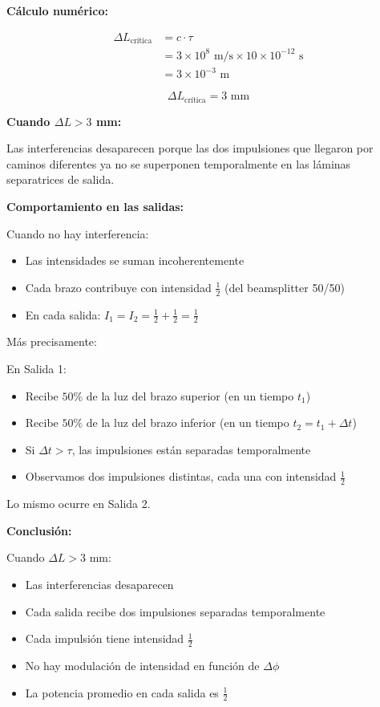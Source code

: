 \documentclass[12pt,a4paper]{article}
\begin{document}
\textbf{Cálculo numérico:}

\begin{align}
    \Delta L_{\text{crítica}} &= c \cdot \tau \\
    &= 3 \times 10^8 \text{ m/s} \times 10 \times 10^{-12} \text{ s} \\
    &= 3 \times 10^{-3} \text{ m}
\end{align}

\begin{equation}
    \boxed{\Delta L_{\text{crítica}} = 3 \text{ mm}}
\end{equation}

\textbf{Cuando $\Delta L > 3$ mm:}

Las interferencias desaparecen porque las dos impulsiones que llegaron por caminos diferentes ya no se superponen temporalmente en las láminas separatrices de salida.

\textbf{Comportamiento en las salidas:}

Cuando no hay interferencia:
\begin{itemize}
    \item Las intensidades se suman incoherentemente
    \item Cada brazo contribuye con intensidad $\frac{1}{2}$ (del beamsplitter 50/50)
    \item En cada salida: $I_1 = I_2 = \frac{1}{2} + \frac{1}{2} = \frac{1}{2}$
\end{itemize}

Más precisamente:

En Salida 1:
\begin{itemize}
    \item Recibe $50\%$ de la luz del brazo superior (en un tiempo $t_1$)
    \item Recibe $50\%$ de la luz del brazo inferior (en un tiempo $t_2 = t_1 + \Delta t$)
    \item Si $\Delta t > \tau$, las impulsiones están separadas temporalmente
    \item Observamos dos impulsiones distintas, cada una con intensidad $\frac{1}{2}$
\end{itemize}

Lo mismo ocurre en Salida 2.

\textbf{Conclusión:}

Cuando $\Delta L > 3$ mm:
\begin{itemize}
    \item Las interferencias desaparecen
    \item Cada salida recibe dos impulsiones separadas temporalmente
    \item Cada impulsión tiene intensidad $\frac{1}{2}$
    \item No hay modulación de intensidad en función de $\Delta\phi$
    \item La potencia promedio en cada salida es $\frac{1}{2}$
\end{itemize}
\end{document}
